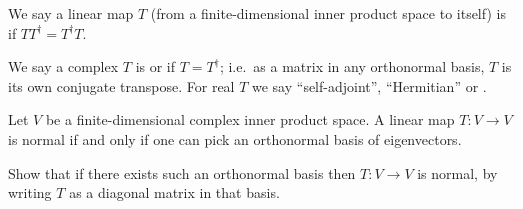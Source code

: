 \begin{definition}
	We say a linear map $T$
	(from a finite-dimensional inner product space to itself)
	is  if $TT^\dagger = T^\dagger T$.

	We say a complex $T$ is  or  if $T = T^\dagger$;
	i.e.\ as a matrix in any orthonormal basis, $T$ is its own conjugate transpose.
	For real $T$ we say ``self-adjoint'', ``Hermitian'' or .
\end{definition}
\begin{theorem}
	Let $V$ be a finite-dimensional complex inner product space.
	A linear map $T \colon V \to V$ is normal
	if and only if one can pick an orthonormal basis of eigenvectors.
\end{theorem}
\begin{exercise}
	Show that if there exists such an orthonormal basis
	then $T \colon V \to V$ is normal,
	by writing $T$ as a diagonal matrix in that basis.
\end{exercise}
